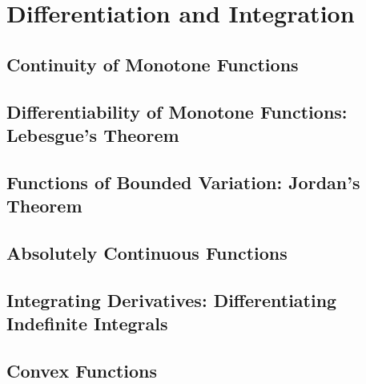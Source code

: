 \chapter{Differentiation and Integration}

\section{Continuity of Monotone Functions}
\section{Differentiability of Monotone Functions: Lebesgue's Theorem}
\section{Functions of Bounded Variation: Jordan's Theorem}
\section{Absolutely Continuous Functions}
\section{Integrating Derivatives: Differentiating Indefinite Integrals}
\section{Convex Functions}
